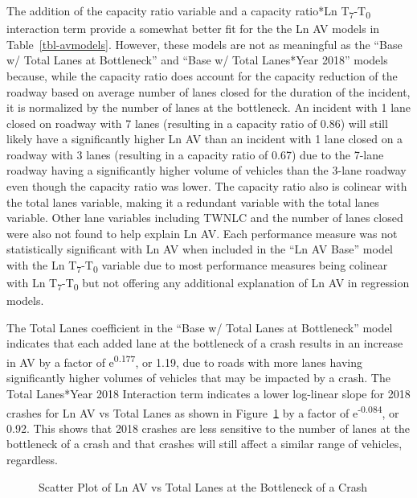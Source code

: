 \documentclass[
  letterpaper,
  authoryear]{elsarticle}
\begin{document}
The addition of the capacity ratio variable and a capacity ratio*Ln
T\textsubscript{7}-T\textsubscript{0} interaction term provide a
somewhat better fit for the the Ln AV models in
Table~\ref{tbl-avmodels}. However, these models are not as meaningful as
the ``Base w/ Total Lanes at Bottleneck'' and ``Base w/ Total Lanes*Year
2018'' models because, while the capacity ratio does account for the
capacity reduction of the roadway based on average number of lanes
closed for the duration of the incident, it is normalized by the number
of lanes at the bottleneck. An incident with 1 lane closed on roadway
with 7 lanes (resulting in a capacity ratio of 0.86) will still likely
have a significantly higher Ln AV than an incident with 1 lane closed on
a roadway with 3 lanes (resulting in a capacity ratio of 0.67) due to
the 7-lane roadway having a significantly higher volume of vehicles than
the 3-lane roadway even though the capacity ratio was lower. The
capacity ratio also is colinear with the total lanes variable, making it
a redundant variable with the total lanes variable. Other lane variables
including TWNLC and the number of lanes closed were also not found to
help explain Ln AV. Each performance measure was not statistically
significant with Ln AV when included in the ``Ln AV Base'' model with
the Ln T\textsubscript{7}-T\textsubscript{0} variable due to most
performance measures being colinear with Ln
T\textsubscript{7}-T\textsubscript{0} but not offering any additional
explanation of Ln AV in regression models.

The Total Lanes coefficient in the ``Base w/ Total Lanes at Bottleneck''
model indicates that each added lane at the bottleneck of a crash
results in an increase in AV by a factor of e\textsuperscript{0.177}, or
1.19, due to roads with more lanes having significantly higher volumes
of vehicles that may be impacted by a crash. The Total Lanes*Year 2018
Interaction term indicates a lower log-linear slope for 2018 crashes for
Ln AV vs Total Lanes as shown in Figure~\ref{fig-LnAVvsTotalLanes} by a
factor of e\textsuperscript{-0.084}, or 0.92. This shows that 2018
crashes are less sensitive to the number of lanes at the bottleneck of a
crash and that crashes will still affect a similar range of vehicles,
regardless.

\begin{figure}


\caption{\label{fig-LnAVvsTotalLanes}Scatter Plot of Ln AV vs Total
Lanes at the Bottleneck of a Crash}

\end{figure}%
\end{document}
